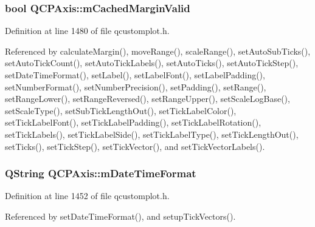 \hypertarget{class_q_c_p_axis_a2cde37b6e385f47e11322df4ac1b0e9b}{}
\subsubsection[{m\+Cached\+Margin\+Valid}]{\setlength{\rightskip}{0pt plus 5cm}bool Q\+C\+P\+Axis\+::m\+Cached\+Margin\+Valid\hspace{0.3cm}{\ttfamily [protected]}}\label{class_q_c_p_axis_a2cde37b6e385f47e11322df4ac1b0e9b}


Definition at line 1480 of file qcustomplot.\+h.



Referenced by calculate\+Margin(), move\+Range(), scale\+Range(), set\+Auto\+Sub\+Ticks(), set\+Auto\+Tick\+Count(), set\+Auto\+Tick\+Labels(), set\+Auto\+Ticks(), set\+Auto\+Tick\+Step(), set\+Date\+Time\+Format(), set\+Label(), set\+Label\+Font(), set\+Label\+Padding(), set\+Number\+Format(), set\+Number\+Precision(), set\+Padding(), set\+Range(), set\+Range\+Lower(), set\+Range\+Reversed(), set\+Range\+Upper(), set\+Scale\+Log\+Base(), set\+Scale\+Type(), set\+Sub\+Tick\+Length\+Out(), set\+Tick\+Label\+Color(), set\+Tick\+Label\+Font(), set\+Tick\+Label\+Padding(), set\+Tick\+Label\+Rotation(), set\+Tick\+Labels(), set\+Tick\+Label\+Side(), set\+Tick\+Label\+Type(), set\+Tick\+Length\+Out(), set\+Ticks(), set\+Tick\+Step(), set\+Tick\+Vector(), and set\+Tick\+Vector\+Labels().

\hypertarget{class_q_c_p_axis_a0b7ad83550d71daab4cfee2918e168e0}{}
\subsubsection[{m\+Date\+Time\+Format}]{\setlength{\rightskip}{0pt plus 5cm}Q\+String Q\+C\+P\+Axis\+::m\+Date\+Time\+Format\hspace{0.3cm}{\ttfamily [protected]}}\label{class_q_c_p_axis_a0b7ad83550d71daab4cfee2918e168e0}


Definition at line 1452 of file qcustomplot.\+h.



Referenced by set\+Date\+Time\+Format(), and setup\+Tick\+Vectors().

